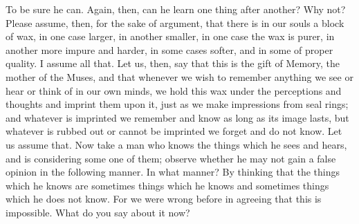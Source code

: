 \documentclass[letterpaper,12pt]{article}
\newcommand{\stephpag}[1]{\marginnote{\small\itshape\fontfamily{ppl}\selectfont #1}}
\begin{document}
\begin{drama}
\theaetetusspeaks
To be sure he can.
\socratesspeaks
Again, then, can he learn one thing after another?
\theaetetusspeaks
Why not?
\socratesspeaks
Please assume, then, for the sake of argument, that there is in our souls a block of wax, in one case larger, in another smaller, in one case the wax is purer, in another more impure and harder, in some cases softer, \stephpag{d} and in some of proper quality.
\theaetetusspeaks
I assume all that.
\socratesspeaks
Let us, then, say that this is the gift of Memory, the mother of the Muses, and that whenever we wish to remember anything we see or hear or think of in our own minds, we hold this wax under the perceptions and thoughts and imprint them upon it, just as we make impressions from seal rings; and whatever is imprinted we remember and know as long as its image lasts, but whatever is rubbed out or \stephpag{e} cannot be imprinted we forget and do not know.
\theaetetusspeaks
Let us assume that.
\socratesspeaks
Now take a man who knows the things which he sees and hears, and is considering some one of them; observe whether he may not gain a false opinion in the following manner.
\theaetetusspeaks
In what manner?
\socratesspeaks
By thinking that the things which he knows are sometimes things which he knows and sometimes things which he does not know. For we were wrong before in agreeing that this is impossible.
\theaetetusspeaks
What do you say about it now? \stephpag{192 a}
\socratesspeaks

\end{drama}
\end{document}
